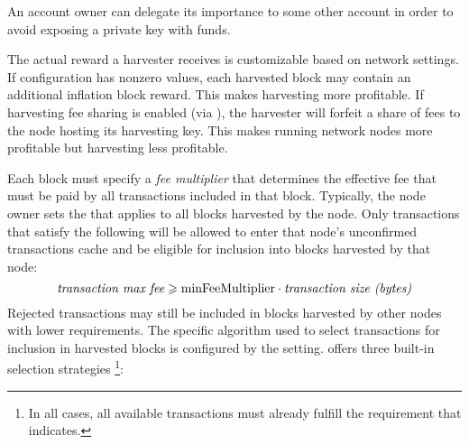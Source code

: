 An account owner can delegate its importance to some other account in order to avoid exposing a private key with funds.

The actual reward a harvester receives is customizable based on network settings.
If  configuration has nonzero values, each harvested block may contain an additional inflation block reward.
This makes harvesting more profitable.
If harvesting fee sharing is enabled (via ), the harvester will forfeit a share of fees to the node hosting its harvesting key.
This makes running network nodes more profitable but harvesting less profitable.


Each block must specify a \emph{fee multiplier} that determines the effective fee that must be paid by all transactions included in that block.
Typically, the node owner sets the  that applies to all blocks harvested by the node.
Only transactions that satisfy the following will be allowed to enter that node's unconfirmed transactions cache and be eligible for inclusion into blocks harvested by that node:
\begin{equation}
\mathname{transaction max fee} \geqslant \nemsetting{node}{minFeeMultiplier} \cdot \mathname{transaction size (bytes)}
\end{equation}
Rejected transactions may still be included in blocks harvested by other nodes with lower requirements.
The specific algorithm used to select transactions for inclusion in harvested blocks is configured by the  setting.
\codenamespace offers three built-in selection strategies
\footnote{In all cases, all available transactions must already fulfill the requirement that  indicates.}:

